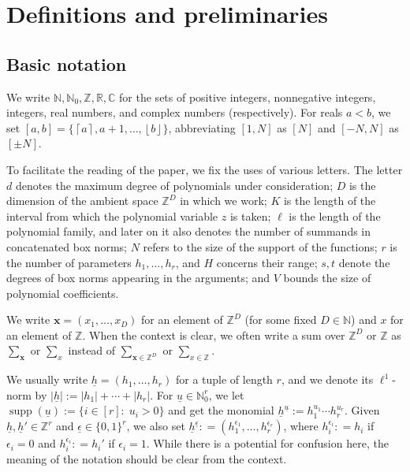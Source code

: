 \documentclass[11pt]{amsart}
\theoremstyle{definition}
\newcommand{\C}{{\mathbb C}}
\newcommand{\N}{{\mathbb N}}
\newcommand{\R}{{\mathbb R}}
\newcommand{\Z}{{\mathbb Z}}
\newcommand{\x}{{\mathbf{x}}}
\newcommand{\bx}{{\mathbf{x}}}
\newcommand{\uh}{{\underline{h}}}
\newcommand{\uu}{{\underline{u}}}
\newcommand{\ueps}{{\underline{\epsilon}}}
\DeclareMathOperator{\supp}{supp}
\newcommand{\floor}[1]{\left \lfloor #1 \right \rfloor}
\newcommand{\ceil}[1]{\left \lceil #1 \right \rceil}
\begin{document}



\section{Definitions and preliminaries}\label{S: definitions}
\subsection{Basic notation}
We write $\N, \N_0,\Z, \R, \C$ for the sets of positive integers, nonnegative integers, integers, real numbers, and complex numbers (respectively). For reals $a<b$, we set $[a,b] = \{\ceil{a}, a+1, \ldots, \floor{b}\}$, abbreviating $[1,N]$ as $[N]$ and $[-N,N]$ as $[\pm N]$.

To facilitate the reading of the paper, we fix the uses of various letters. The letter $d$ denotes the maximum degree of polynomials under consideration; $D$ is the dimension of the ambient space $\Z^D$ in which we work; $K$ is the length of the interval from which the polynomial variable $z$ is taken; $\ell$ is the length of the polynomial family, and later on it also denotes the number of summands in concatenated box norms; $N$ refers to the {size of the} support of the functions; $r$ is the number of parameters $h_1, \ldots, h_r$, and $H$ concerns their range; $s,t$ denote the degrees of box norms appearing in the arguments; and $V$ bounds the size of polynomial coefficients.

We write $\x = (x_1, \ldots, x_D)$ for an element of $\Z^D$ (for some fixed $D\in\N$) and $x$ for an element of $\Z$. When the context is clear, we often write a sum over $\Z^D$ or $\Z$ as $\sum_{\bx}$ or $\sum_x$ instead of $\sum_{\bx \in \Z^D}$ or $\sum_{x \in \Z}$.

We usually write $\uh=(h_1, \ldots, h_r)$ for a tuple of length $r$, and we denote its $\ell^1$-norm by $|\uh|:=|h_1|+\cdots + |h_r|$. For $\uu\in\N_0^r$, we let $\supp(\uu):=\{i\in[r]:\; u_i>0\}$ and get the monomial $\uh^\uu:= h_1^{u_1}\cdots h_r^{u_r}$. Given $\uh,\uh'\in\Z^r$ and $\ueps\in\{0,1\}^r$, we also set $\uh^\ueps: =(h_1^{\epsilon_1}, \ldots, h_r^{\epsilon_r})$, where $h_i^{\epsilon_i}: = h_i$ if $\epsilon_i = 0$ and $h_i^{\epsilon_i}: = h_i'$ if $\epsilon_i = 1$.
{While there is a potential for confusion here, the meaning of the notation should be clear from the context.}
\end{document}
